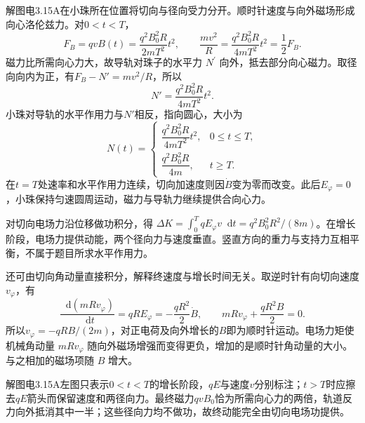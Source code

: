 \documentclass[UTF8,fontset=fandol,a4paper,11pt]{ctexart}
\newcommand{\dd}{\mathop{}\!\mathrm{d}}
\begin{document}
解图电3.15A在小珠所在位置将切向与径向受力分开。顺时针速度与向外磁场形成向心洛伦兹力。对$0<t<T$，
\[
F_B=qvB(t)=\frac{q^2B_0^2R}{2mT^2}t^2,
\qquad
\frac{mv^2}{R}=\frac{q^2B_0^2R}{4mT^2}t^2=\frac12F_B.
\]
磁力比所需向心力大，故导轨对珠子的水平力 $N^\prime$ 向外，抵去部分向心磁力。取径向向内为正，有$F_B-N'=mv^2/R$，所以
\[
N'=\frac{q^2B_0^2R}{4mT^2}t^2.
\]
小珠对导轨的水平作用力与$N'$相反，指向圆心，大小为
\[
\boxed{N(t)=\begin{cases}\dfrac{q^2B_0^2R}{4mT^2}t^2,&0\le t\le T,\\[2pt]\dfrac{q^2B_0^2R}{4m},&t\ge T.\end{cases}}
\]
在$t=T$处速率和水平作用力连续，切向加速度则因$\dot B$变为零而改变。此后$E_\varphi=0$，小珠保持匀速圆周运动，磁力与导轨力继续提供合向心力。

对切向电场力沿位移做功积分，得 $\Delta K=\int_0^T qE_\varphi v\dd t=q^2B_0^2R^2/(8m)$。在增长阶段，电场力提供动能，两个径向力与速度垂直。竖直方向的重力与支持力互相平衡，不属于题目所求水平作用力。

还可由切向角动量直接积分，解释终速度与增长时间无关。取逆时针有向切向速度$v_\varphi$，有
\[
\frac{\dd(mRv_\varphi)}{\dd t}=qRE_\varphi
=-\frac{qR^2}{2}\dot B,
\qquad
mRv_\varphi+\frac{qR^2B}{2}=0.
\]
所以$v_\varphi=-qRB/(2m)$，对正电荷及向外增长的$B$即为顺时针运动。电场力矩使机械角动量 $mRv_\varphi$ 随向外磁场增强而变得更负，增加的是顺时针角动量的大小。与之相加的磁场项随 $B$ 增大。

解图电3.15A左图只表示$0<t<T$的增长阶段，$qE$与速度$v$分别标注；$t>T$时应擦去$qE$箭头而保留速度和两径向力。最终磁力$qvB_0$恰为所需向心力的两倍，轨道反力向外抵消其中一半；这些径向力均不做功，故终动能完全由切向电场功提供。
\end{document}
